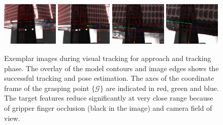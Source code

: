 %
\begin{figure}
\centering\includegraphics[angle=0,width=0.24\textwidth]{./figures/frame0786_result_cam0_xes}
\centering\includegraphics[angle=0,width=0.24\textwidth]{./figures/frame0849_result_cam0_xes}
\centering\includegraphics[angle=0,width=0.24\textwidth]{./figures/frame0922_result_cam0_xes}
\centering\includegraphics[angle=0,width=0.24\textwidth]{./figures/frame0954_result_cam0_xes}
\caption{Exemplar images during visual tracking for approach and tracking phase. The overlay of the model contours  and image edges shows the successful tracking and pose estimation. The axes of the coordinate frame of the grasping point $\{\mathcal{G}\}$ are indicated in red, green and blue. The target features reduce significantly at very close range because of gripper finger occlusion (black in the image) and camera field of view.}
\label{fig:TrackingImages}
\end{figure}




